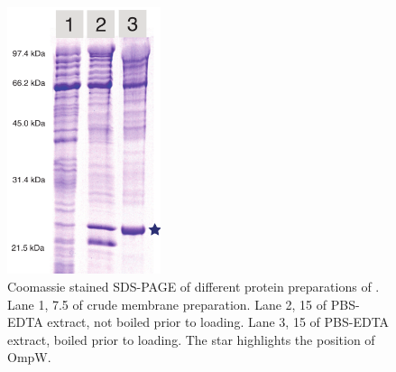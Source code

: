 \begin{figure}[H]
  	\begin{center}
   		\includegraphics[width=0.4\textwidth]{porin_chapter/img/Fig1-pbsedta.pdf}
   	\end{center}
   	\caption[Coomassie stained \ac{SDS-PAGE} of different protein preparations of \caulobacter.]{
	   	Coomassie stained \ac{SDS-PAGE} of different protein preparations of \caulobacter. 
Lane 1, 7.5 \microlitre of crude membrane preparation. Lane 2, 15 \microlitre of \ac{PBS}-\ac{EDTA} extract, not boiled prior to loading. Lane 3, 15 \microlitre of \ac{PBS}-\ac{EDTA} extract, boiled prior to loading. The star highlights the position of OmpW.
 	}
   	\label{fig:porin-pbsedtagel}
\end{figure}   

